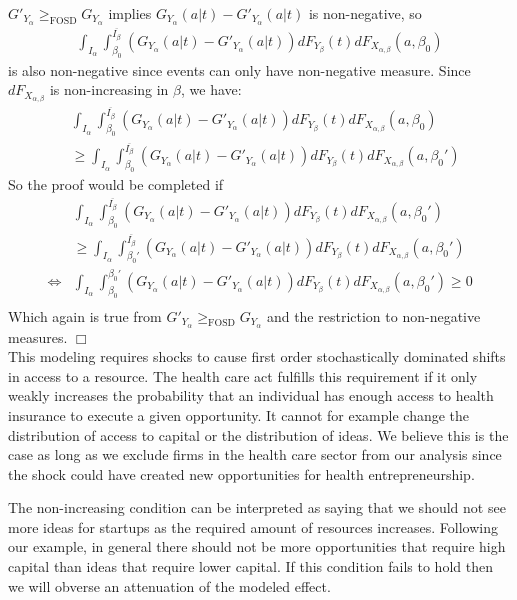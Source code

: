 \documentclass[12pt]{article}
\begin{document}
$G'_{Y_\alpha} \mathop{\ge}_{\text{FOSD}} G_{Y_\alpha}$ implies $G_{Y_{\alpha}}(a|t) - G'_{Y_{\alpha}}(a|t)$ is non-negative, so 
\begin{align*}
\int_{I_{\alpha}} \int_{\beta_0}^{\overline{I_{\beta}}} (G_{Y_{\alpha}}(a|t) - G'_{Y_{\alpha}}(a|t)) dF_{Y_{\beta}}(t) dF_{X_{\alpha,\beta}}(a,\beta_0)
\end{align*}
is also non-negative since events can only have non-negative measure. Since $dF_{X_{\alpha,\beta}}$ is non-increasing in $\beta$, we have: 
\begin{align*}
& \int_{I_{\alpha}} \int_{\beta_0}^{\overline{I_{\beta}}} (G_{Y_{\alpha}}(a|t) - G'_{Y_{\alpha}}(a|t)) dF_{Y_{\beta}}(t) dF_{X_{\alpha,\beta}}(a,\beta_0)\\
& \ge \int_{I_{\alpha}} \int_{\beta_0}^{\overline{I_{\beta}}} (G_{Y_{\alpha}}(a|t) - G'_{Y_{\alpha}}(a|t)) dF_{Y_{\beta}}(t) dF_{X_{\alpha,\beta}}(a,\beta_0')
\end{align*}
So the proof would be completed if
\begin{align*}
& \int_{I_{\alpha}} \int_{\beta_0}^{\overline{I_{\beta}}} (G_{Y_{\alpha}}(a|t) - G'_{Y_{\alpha}}(a|t)) dF_{Y_{\beta}}(t) dF_{X_{\alpha,\beta}}(a,\beta_0') \\
&  \ge  \int_{I_{\alpha}} \int_{\beta_0'}^{\overline{I_{\beta}}} (G_{Y_{\alpha}}(a|t) - G'_{Y_{\alpha}}(a|t)) dF_{Y_{\beta}}(t) dF_{X_{\alpha,\beta}}(a,\beta_0')\\
\iff & \int_{I_{\alpha}} \int_{\beta_0}^{\beta_0'} (G_{Y_{\alpha}}(a|t) - G'_{Y_{\alpha}}(a|t)) dF_{Y_{\beta}}(t) dF_{X_{\alpha,\beta}}(a,\beta_0') \ge 0\\
\end{align*}
Which again is true from $G'_{Y_\alpha} \mathop{\ge}_{\text{FOSD}} G_{Y_\alpha}$ and the restriction to non-negative measures. $\Box$ \\

This modeling requires shocks to cause first order stochastically dominated shifts in access to a resource. The health care act fulfills this requirement if it only weakly increases the probability that an individual has enough access to health insurance to execute a given opportunity. It cannot for example change the distribution of access to capital or the distribution of ideas. We believe this is the case as long as we exclude firms in the health care sector from our analysis since the shock could have created new opportunities for health entrepreneurship.  

The non-increasing condition can be interpreted as saying that we should not see more ideas for startups as the required amount of resources increases. Following our example, in general there should not be more opportunities that require high capital than ideas that require lower capital. If this condition fails to hold then we will obverse an attenuation of the modeled effect. 
\end{document}
